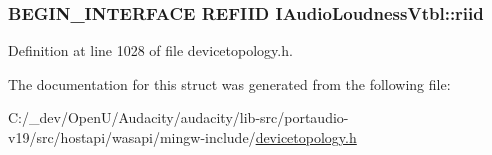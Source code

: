 \subsubsection[{\texorpdfstring{riid}{riid}}]{\setlength{\rightskip}{0pt plus 5cm}B\+E\+G\+I\+N\+\_\+\+I\+N\+T\+E\+R\+F\+A\+CE {\bf R\+E\+F\+I\+ID} I\+Audio\+Loudness\+Vtbl\+::riid}\hypertarget{struct_i_audio_loudness_vtbl_a05666533cf4bd410c8e102681041c1eb}{}\label{struct_i_audio_loudness_vtbl_a05666533cf4bd410c8e102681041c1eb}


Definition at line 1028 of file devicetopology.\+h.



The documentation for this struct was generated from the following file\+:\begin{DoxyCompactItemize}
\item 
C\+:/\+\_\+dev/\+Open\+U/\+Audacity/audacity/lib-\/src/portaudio-\/v19/src/hostapi/wasapi/mingw-\/include/\hyperlink{devicetopology_8h}{devicetopology.\+h}\end{DoxyCompactItemize}
